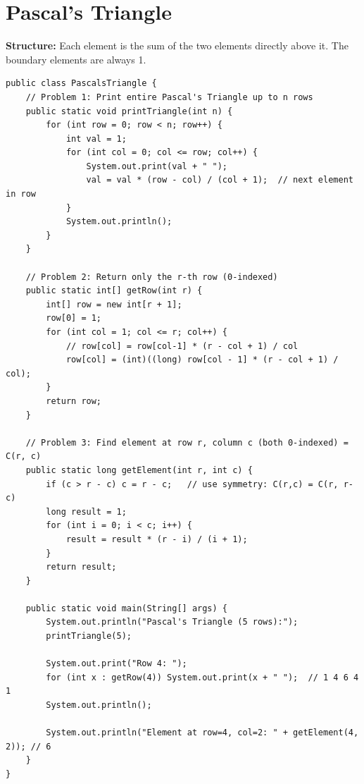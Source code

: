 \documentclass[12pt,a4paper,oneside]{book}
\begin{document}
\section{Pascal's Triangle}

\textbf{Structure:} Each element is the sum of the two elements directly above it. The boundary elements are always 1.

\begin{center}
\end{center}

\begin{lstlisting}[caption={Print Pascal's Triangle --- n rows}]
public class PascalsTriangle {
    // Problem 1: Print entire Pascal's Triangle up to n rows
    public static void printTriangle(int n) {
        for (int row = 0; row < n; row++) {
            int val = 1;
            for (int col = 0; col <= row; col++) {
                System.out.print(val + " ");
                val = val * (row - col) / (col + 1);  // next element in row
            }
            System.out.println();
        }
    }

    // Problem 2: Return only the r-th row (0-indexed)
    public static int[] getRow(int r) {
        int[] row = new int[r + 1];
        row[0] = 1;
        for (int col = 1; col <= r; col++) {
            // row[col] = row[col-1] * (r - col + 1) / col
            row[col] = (int)((long) row[col - 1] * (r - col + 1) / col);
        }
        return row;
    }

    // Problem 3: Find element at row r, column c (both 0-indexed) = C(r, c)
    public static long getElement(int r, int c) {
        if (c > r - c) c = r - c;   // use symmetry: C(r,c) = C(r, r-c)
        long result = 1;
        for (int i = 0; i < c; i++) {
            result = result * (r - i) / (i + 1);
        }
        return result;
    }

    public static void main(String[] args) {
        System.out.println("Pascal's Triangle (5 rows):");
        printTriangle(5);

        System.out.print("Row 4: ");
        for (int x : getRow(4)) System.out.print(x + " ");  // 1 4 6 4 1
        System.out.println();

        System.out.println("Element at row=4, col=2: " + getElement(4, 2)); // 6
    }
}
\end{lstlisting}
\end{document}
